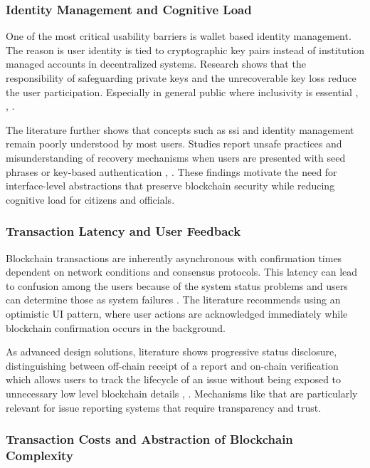 \subsubsection*{Identity Management and Cognitive Load}

One of the most critical usability barriers is wallet based identity management. The reason is user identity is tied to cryptographic key pairs instead of institution managed accounts in decentralized systems. Research shows that the responsibility of safeguarding private keys and the unrecoverable key loss reduce the user participation. Especially in general public where inclusivity is essential \cite{sonule2025uxweb3}, \cite{ramotion2026uiux}, \cite{fintechweekly2025usability}.  

The literature further shows that concepts such as \ac{ssi} and identity management remain poorly understood by most users. Studies report unsafe practices and misunderstanding of recovery mechanisms when users are presented with seed phrases or key-based authentication \cite{oup2022governance}, \cite{fraunhofer2026usability}. These findings motivate the need for interface-level abstractions that preserve blockchain security while reducing cognitive load for citizens and officials.

\subsubsection*{Transaction Latency and User Feedback}

Blockchain transactions are inherently asynchronous with confirmation times dependent on network conditions and consensus protocols. This latency can lead to confusion among  the users because of the system status problems and users can determine those as system failures \cite{sonule2025uxweb3}. The literature recommends using an optimistic \ac{UI} pattern, where user actions are acknowledged immediately while blockchain confirmation occurs in the background.  

As advanced design solutions, literature shows progressive status disclosure, distinguishing between off-chain receipt of a report and on-chain verification which allows users to track the lifecycle of an issue without being exposed to unnecessary low level blockchain details \cite{dzone2026blockchainai}, \cite{marian2025transparent}. Mechanisms like that are particularly relevant for issue reporting systems that require transparency and trust.

\subsubsection*{Transaction Costs and Abstraction of Blockchain Complexity}

